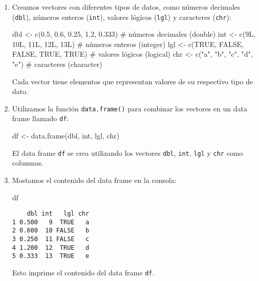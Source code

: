 \documentclass[
  a4paper,
]{article}
\newenvironment{Shaded}{}{}
\newcommand{\CommentTok}[1]{\textcolor[rgb]{0.42,0.45,0.49}{#1}}
\newcommand{\ConstantTok}[1]{\textcolor[rgb]{0.00,0.36,0.77}{#1}}
\newcommand{\DecValTok}[1]{\textcolor[rgb]{0.00,0.36,0.77}{#1}}
\newcommand{\FloatTok}[1]{\textcolor[rgb]{0.00,0.36,0.77}{#1}}
\newcommand{\FunctionTok}[1]{\textcolor[rgb]{0.44,0.26,0.76}{#1}}
\newcommand{\NormalTok}[1]{\textcolor[rgb]{0.14,0.16,0.18}{#1}}
\newcommand{\OtherTok}[1]{\textcolor[rgb]{0.44,0.26,0.76}{#1}}
\newcommand{\StringTok}[1]{\textcolor[rgb]{0.01,0.18,0.38}{#1}}
\begin{document}
\begin{enumerate}
\def\labelenumi{\arabic{enumi}.}
\item
  Creamos vectores con diferentes tipos de datos, como números decimales
  (\texttt{dbl}), números enteros (\texttt{int}), valores lógicos
  (\texttt{lgl}) y caracteres (\texttt{chr}):

\begin{Shaded}
\begin{Highlighting}[]
\NormalTok{dbl }\OtherTok{\textless{}{-}} \FunctionTok{c}\NormalTok{(}\FloatTok{0.5}\NormalTok{, }\FloatTok{0.6}\NormalTok{, }\FloatTok{0.25}\NormalTok{, }\FloatTok{1.2}\NormalTok{, }\FloatTok{0.333}\NormalTok{) }\CommentTok{\# números decimales (double)}
\NormalTok{int }\OtherTok{\textless{}{-}} \FunctionTok{c}\NormalTok{(}\DecValTok{9}\NormalTok{L, }\DecValTok{10}\NormalTok{L, }\DecValTok{11}\NormalTok{L, }\DecValTok{12}\NormalTok{L, }\DecValTok{13}\NormalTok{L) }\CommentTok{\# números enteros (integer)}
\NormalTok{lgl }\OtherTok{\textless{}{-}} \FunctionTok{c}\NormalTok{(}\ConstantTok{TRUE}\NormalTok{, }\ConstantTok{FALSE}\NormalTok{, }\ConstantTok{FALSE}\NormalTok{, }\ConstantTok{TRUE}\NormalTok{, }\ConstantTok{TRUE}\NormalTok{) }\CommentTok{\# valores lógicos (logical)}
\NormalTok{chr }\OtherTok{\textless{}{-}} \FunctionTok{c}\NormalTok{(}\StringTok{"a"}\NormalTok{, }\StringTok{"b"}\NormalTok{, }\StringTok{"c"}\NormalTok{, }\StringTok{"d"}\NormalTok{, }\StringTok{"e"}\NormalTok{) }\CommentTok{\# caracteres (character)}
\end{Highlighting}
\end{Shaded}

  Cada vector tiene elementos que representan valores de su respectivo
  tipo de dato.
\item
  Utilizamos la función \texttt{data.frame()} para combinar los vectores
  en un data frame llamado \texttt{df}:

\begin{Shaded}
\begin{Highlighting}[]
\NormalTok{df }\OtherTok{\textless{}{-}} \FunctionTok{data.frame}\NormalTok{(dbl, int, lgl, chr)}
\end{Highlighting}
\end{Shaded}

  El data frame \texttt{df} se crea utilizando los vectores
  \texttt{dbl}, \texttt{int}, \texttt{lgl} y \texttt{chr} como columnas.
\item
  Mostamos el contenido del data frame en la consola:

\begin{Shaded}
\begin{Highlighting}[]
\NormalTok{df}
\end{Highlighting}
\end{Shaded}

\begin{verbatim}
    dbl int   lgl chr
1 0.500   9  TRUE   a
2 0.600  10 FALSE   b
3 0.250  11 FALSE   c
4 1.200  12  TRUE   d
5 0.333  13  TRUE   e
\end{verbatim}

  Esto imprime el contenido del data frame \texttt{df}.
\end{enumerate}
\end{document}
